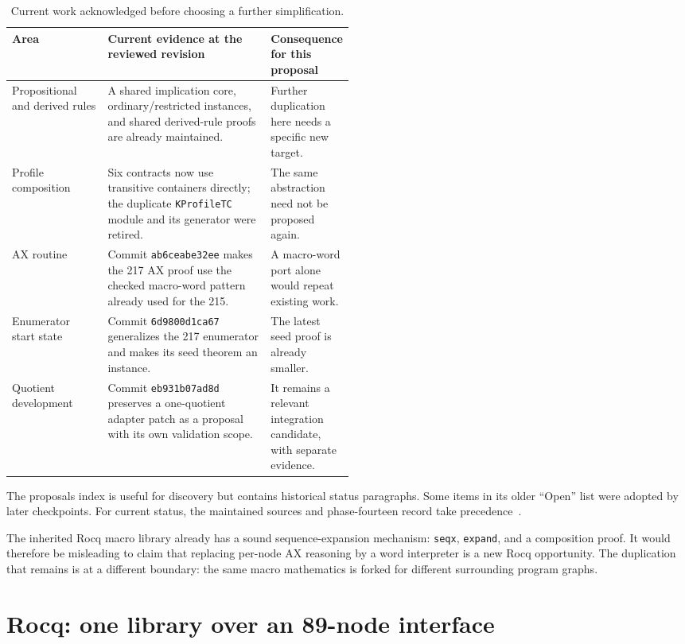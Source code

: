 \documentclass[11pt,letterpaper]{article}
\theoremstyle{definition}\newtheorem{definition}[theorem]{Definition}
\theoremstyle{remark}\newtheorem{remark}[theorem]{Remark}
\newcommand{\code}[1]{\texttt{\small #1}}
\begin{document}
\begin{table}[ht]
\centering\small
\begin{tabularx}{\linewidth}{@{}p{0.28\linewidth}Xp{0.22\linewidth}@{}}
\toprule
Area & Current evidence at the reviewed revision & Consequence for this proposal\\
\midrule
Propositional and derived rules & A shared implication core, ordinary/restricted instances, and shared derived-rule proofs are already maintained. & Further duplication here needs a specific new target.\\
Profile composition & Six contracts now use transitive containers directly; the duplicate \code{KProfileTC} module and its generator were retired. & The same abstraction need not be proposed again.\\
AX routine & Commit \code{ab6ceabe32ee} makes the 217 AX proof use the checked macro-word pattern already used for the 215. & A macro-word port alone would repeat existing work.\\
Enumerator start state & Commit \code{6d9800d1ca67} generalizes the 217 enumerator and makes its seed theorem an instance. & The latest seed proof is already smaller.\\
Quotient development & Commit \code{eb931b07ad8d} preserves a one-quotient adapter patch as a proposal with its own validation scope. & It remains a relevant integration candidate, with separate evidence.\\
\bottomrule
\end{tabularx}
\caption{Current work acknowledged before choosing a further simplification.}
\end{table}

The proposals index is useful for discovery but contains historical status paragraphs. Some items in its older ``Open'' list were adopted by later checkpoints. For current status, the maintained sources and phase-fourteen record take precedence~\cite{phase14,index}.

The inherited Rocq macro library already has a sound sequence-expansion mechanism: \code{seqx}, \code{expand}, and a composition proof. It would therefore be misleading to claim that replacing per-node AX reasoning by a word interpreter is a new Rocq opportunity. The duplication that remains is at a different boundary: the same macro mathematics is forked for different surrounding program graphs.

\section{Rocq: one library over an 89-node interface}
\end{document}
